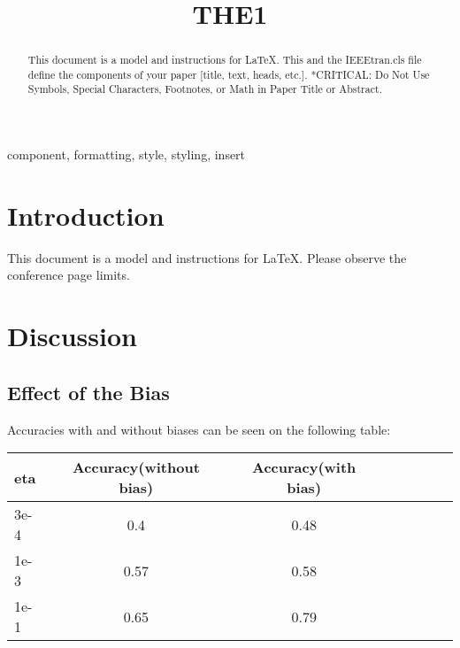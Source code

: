 \documentclass[conference]{IEEEtran}
\begin{document}
\title{THE1\\
}

\author{
}

\maketitle

\begin{abstract}
This document is a model and instructions for \LaTeX.
This and the IEEEtran.cls file define the components of your paper [title, text, heads, etc.]. *CRITICAL: Do Not Use Symbols, Special Characters, Footnotes, 
or Math in Paper Title or Abstract.
\end{abstract}

\begin{IEEEkeywords}
component, formatting, style, styling, insert
\end{IEEEkeywords}

\section{Introduction}
This document is a model and instructions for \LaTeX.
Please observe the conference page limits. 

\section{Discussion}

\subsection{Effect of the Bias}

Accuracies with and without biases can be seen on the following table: \\

\begin{tabular}{l*{6}{c}r}
eta  & Accuracy(without bias) & Accuracy(with bias) \\
\hline
3e-4 & 0.4 & 0.48 \\
1e-3 & 0.57 & 0.58 \\
1e-1 & 0.65 & 0.79 \\
\end{tabular} \\
\end{document}
